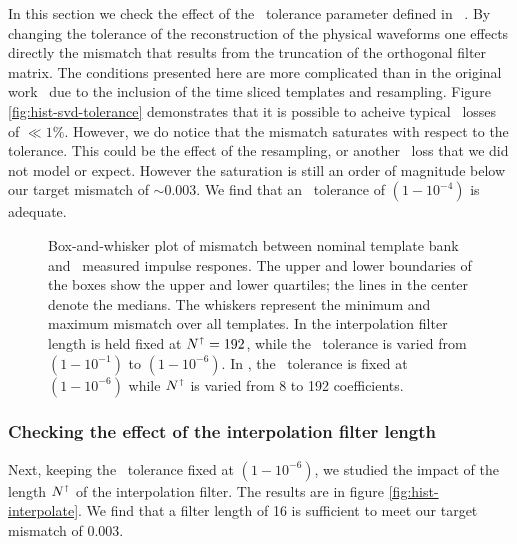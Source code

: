 In this section we check the effect of the \SVD\ tolerance parameter defined in
~\cite{Cannon:2010p10398}.  By changing the tolerance of the reconstruction of
the physical waveforms one effects directly the mismatch that results from the
truncation of the orthogonal filter matrix.  The conditions presented here are
more complicated than in the original work~\cite{Cannon:2010p10398} due to the
inclusion of the time sliced templates and resampling.    Figure \ref{fig:hist-svd-tolerance}
demonstrates that it is possible to acheive typical \SNR\ losses of $\ll1\%$.
However, we do notice that the mismatch saturates with respect to the tolerance.
This could be the effect of the resampling, or another \SNR\ loss that we did
not model or expect.  However the saturation is still an order of magnitude below our target mismatch of $\sim 0.003$.  We find that an \SVD\ tolerance of
$\left(1-10^{-4}\right)$ is adequate. 
%
\begin{figure}
	\begin{center}
		\caption{Box-and-whisker plot of mismatch between nominal
template bank and \lloid\ measured impulse respones.  The upper and lower boundaries of
the boxes show the upper and lower quartiles; the lines in the center denote the medians.
The whiskers represent the minimum and maximum mismatch over all templates.  In 
 the interpolation filter length is held fixed
at $N^\shortuparrow = 192$, while the \SVD\ tolerance is varied from
$\left(1-10^{-1}\right)$ to $\left(1-10^{-6}\right)$.  In , the \SVD\ tolerance is fixed at $\left(1-10^{-6}\right)$ while $N^\shortuparrow$ is varied from 8 to 192 coefficients.}
	\end{center}
\end{figure}

\subsubsection{Checking the effect of the interpolation filter length}

Next, keeping the \SVD\ tolerance fixed at $\left(1-10^{-6}\right)$, we studied the
impact of the length $N^\shortuparrow$ of the interpolation filter.  The results are in
figure \ref{fig:hist-interpolate}.  We find that a filter length of 16 is sufficient
to meet our target mismatch of 0.003.



